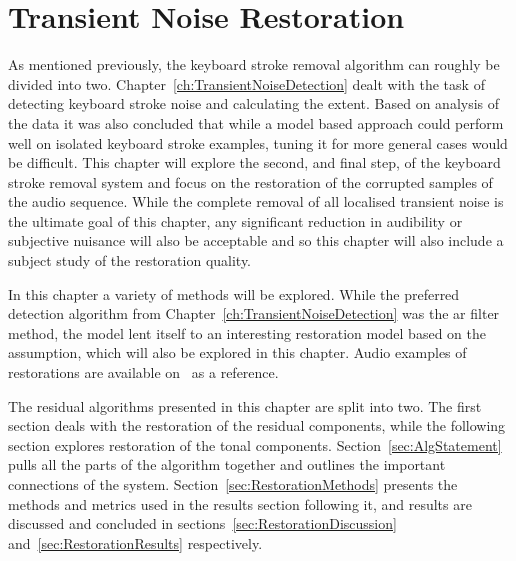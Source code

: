 \chapter{Transient Noise Restoration}\label{ch:TransientNoiseRestoration}

\ifpdf
    \graphicspath{{Chapter6_TransNoiseRest/Chapter6Figs/PNG/}{Chapter6_TransNoiseRest/Chapter6Figs/PDF/}{Chapter6_TransNoiseRest/Chapter6Figs/}{Chapter6_TransNoiseRest/Chapter6Figs/Subjective/}{Chapter6_TransNoiseRest/Chapter6Figs/Results/}{Chapter6_TransNoiseRest/Chapter6Figs/waveformResultsFinalHello123/}}
\else
    \graphicspath{{Chapter6_TransNoiseRest/Chapter6Figs/EPS/}{Chapter6_TransNoiseRest/Chapter6Figs/}}
\fi

As mentioned previously, the keyboard stroke removal algorithm can roughly be divided into two. Chapter~\ref{ch:TransientNoiseDetection} dealt with the task of detecting keyboard stroke noise and calculating the \DIFdelbegin {}\DIFdelend \DIFaddbegin {}\DIFaddend extent. Based on analysis of the data it was also concluded that while a model based approach could perform well on isolated keyboard stroke examples, tuning it for more general cases would be difficult. This chapter will explore the second, and final step, of the keyboard stroke removal system and focus on the restoration of the corrupted samples of the audio sequence. While the complete removal of all localised transient noise is the ultimate goal of this chapter, any significant reduction in audibility or subjective nuisance will also be acceptable and so this chapter will also include a subject study of the restoration quality.

In this chapter a variety of methods will be explored. While the preferred detection algorithm from Chapter~\ref{ch:TransientNoiseDetection} was the \DIFdelbegin {}\DIFdelend \DIFaddbegin \gls{ar} \DIFaddend filter method, the \DIFdelbegin {}\DIFdelend \DIFaddbegin {}\DIFaddend model lent itself to an interesting restoration model based on the \DIFdelbegin {}\DIFdelend \DIFaddbegin {}\DIFaddend assumption, which will also be explored in this chapter. Audio examples of restorations are available on \siteURL~as a reference.

The residual algorithms presented in this chapter are split into two. The first section deals with the restoration of the residual components, while the following section explores restoration of the tonal components. Section~\ref{sec:AlgStatement} pulls all the parts of the algorithm together and outlines the important connections of the system. Section~\ref{sec:RestorationMethods} presents the methods and metrics used in the results section following it, and results are discussed and concluded in sections~\ref{sec:RestorationDiscussion} and~\ref{sec:RestorationResults} respectively.

